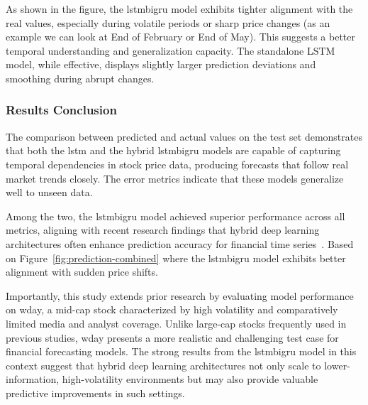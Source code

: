 As shown in the figure, the \acrshort{lstmbigru} model exhibits tighter alignment 
with the real values, especially during volatile periods or sharp price changes 
(as an example we can look at End of February or End of May). This
suggests a better temporal understanding and generalization capacity. The standalone
LSTM model, while effective, displays slightly larger prediction deviations and 
smoothing during abrupt changes.

\subsubsection{Results Conclusion}

The comparison between predicted and actual values on the test set demonstrates that 
both the \acrshort{lstm} and the hybrid \acrshort{lstmbigru} models are capable of 
capturing temporal dependencies in stock price data, producing forecasts that follow 
real market trends closely. The error metrics indicate that these models generalize 
well to unseen data.

Among the two, the \acrshort{lstmbigru} model achieved superior performance across 
all metrics, aligning with recent research findings that hybrid deep learning 
architectures often enhance prediction accuracy for financial time 
series~\parencite{balasubramanian2023SystematicSurvey}. Based on 
Figure~\ref{fig:prediction-combined}
where the \acrshort{lstmbigru} model exhibits better alignment with sudden 
price shifts.

Importantly, this study extends prior research by evaluating model performance on 
\acrfull{wday}, a mid-cap stock characterized by high volatility and comparatively 
limited media and analyst coverage. Unlike large-cap stocks frequently used in 
previous studies, \acrshort{wday} presents a more realistic and challenging test case 
for financial forecasting models. The strong results from the \acrshort{lstmbigru} model 
in this context suggest that hybrid deep learning architectures not only scale to 
lower-information, high-volatility environments but may also provide valuable 
predictive improvements in such settings.
